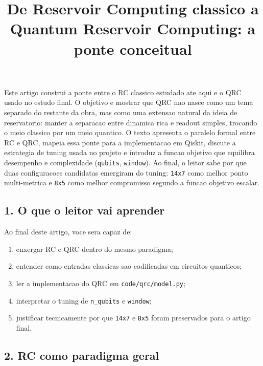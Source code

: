 \documentclass[12pt]{article}
\title{De Reservoir Computing classico a Quantum Reservoir Computing: a ponte conceitual}
\author{}
\providecommand{\tightlist}{%
          \setlength{\itemsep}{0pt}\setlength{\parskip}{0pt}}
\begin{document}
        \maketitle

        \begin{resumo}
        Este artigo construi a ponte entre o RC classico estudado ate aqui e o QRC usado no estudo final. O objetivo e mostrar que QRC nao nasce como um tema separado do restante da obra, mas como uma extensao natural da ideia de reservatorio: manter a separacao entre dinamica rica e readout simples, trocando o meio classico por um meio quantico. O texto apresenta o paralelo formal entre RC e QRC, mapeia essa ponte para a implementacao em Qiskit, discute a estrategia de tuning usada no projeto e introduz a funcao objetivo que equilibra desempenho e complexidade (\texttt{qubits}, \texttt{window}). Ao final, o leitor sabe por que duas configuracoes candidatas emergiram do tuning: \texttt{14x7} como melhor ponto multi-metrica e \texttt{8x5} como melhor compromisso segundo a funcao objetivo escalar.
        \end{resumo}

        \subsection{1. O que o leitor vai aprender}\label{1-o-que-o-leitor-vai-aprender}

Ao final deste artigo, voce sera capaz de:

\begin{enumerate}
\def\labelenumi{\arabic{enumi}.}
\tightlist
\item
  enxergar RC e QRC dentro do mesmo paradigma;
\item
  entender como entradas classicas sao codificadas em circuitos quanticos;
\item
  ler a implementacao do QRC em \texttt{code/qrc/model.py};
\item
  interpretar o tuning de \texttt{n\_qubits} e \texttt{window};
\item
  justificar tecnicamente por que \texttt{14x7} e \texttt{8x5} foram preservados para o artigo final.
\end{enumerate}

\subsection{2. RC como paradigma geral}\label{2-rc-como-paradigma-geral}
\end{document}
